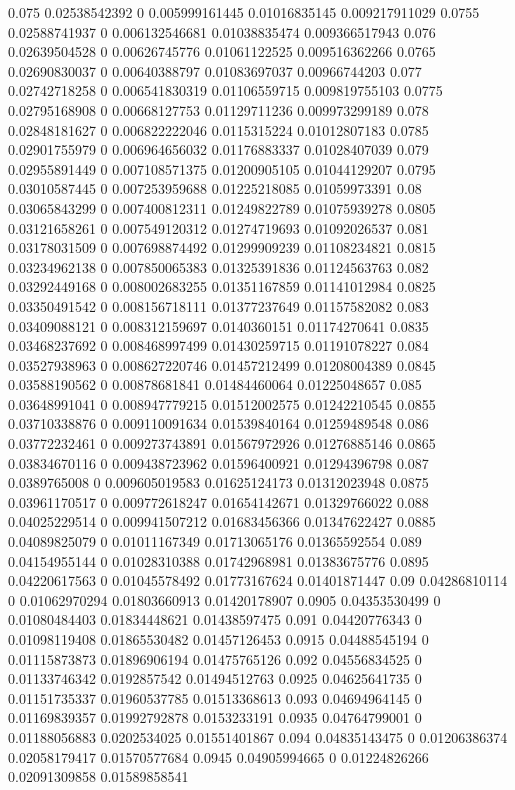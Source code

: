 {0.075 0.02538542392 0 0.005999161445 0.01016835145 0.009217911029
0.0755 0.02588741937 0 0.006132546681 0.01038835474 0.009366517943
0.076 0.02639504528 0 0.00626745776 0.01061122525 0.009516362266
0.0765 0.02690830037 0 0.00640388797 0.01083697037 0.00966744203
0.077 0.02742718258 0 0.006541830319 0.01106559715 0.009819755103
0.0775 0.02795168908 0 0.00668127753 0.01129711236 0.009973299189
0.078 0.02848181627 0 0.006822222046 0.0115315224 0.01012807183
0.0785 0.02901755979 0 0.006964656032 0.01176883337 0.01028407039
0.079 0.02955891449 0 0.007108571375 0.01200905105 0.01044129207
0.0795 0.03010587445 0 0.007253959688 0.01225218085 0.01059973391
0.08 0.03065843299 0 0.007400812311 0.01249822789 0.01075939278
0.0805 0.03121658261 0 0.007549120312 0.01274719693 0.01092026537
0.081 0.03178031509 0 0.007698874492 0.01299909239 0.01108234821
0.0815 0.03234962138 0 0.007850065383 0.01325391836 0.01124563763
0.082 0.03292449168 0 0.008002683255 0.01351167859 0.01141012984
0.0825 0.03350491542 0 0.008156718111 0.01377237649 0.01157582082
0.083 0.03409088121 0 0.008312159697 0.0140360151 0.01174270641
0.0835 0.03468237692 0 0.008468997499 0.01430259715 0.01191078227
0.084 0.03527938963 0 0.008627220746 0.01457212499 0.01208004389
0.0845 0.03588190562 0 0.00878681841 0.01484460064 0.01225048657
0.085 0.03648991041 0 0.008947779215 0.01512002575 0.01242210545
0.0855 0.03710338876 0 0.009110091634 0.01539840164 0.01259489548
0.086 0.03772232461 0 0.009273743891 0.01567972926 0.01276885146
0.0865 0.03834670116 0 0.009438723962 0.01596400921 0.01294396798
0.087 0.0389765008 0 0.009605019583 0.01625124173 0.01312023948
0.0875 0.03961170517 0 0.009772618247 0.01654142671 0.01329766022
0.088 0.04025229514 0 0.009941507212 0.01683456366 0.01347622427
0.0885 0.04089825079 0 0.01011167349 0.01713065176 0.01365592554
0.089 0.04154955144 0 0.01028310388 0.01742968981 0.01383675776
0.0895 0.04220617563 0 0.01045578492 0.01773167624 0.01401871447
0.09 0.04286810114 0 0.01062970294 0.01803660913 0.01420178907
0.0905 0.04353530499 0 0.01080484403 0.01834448621 0.01438597475
0.091 0.04420776343 0 0.01098119408 0.01865530482 0.01457126453
0.0915 0.04488545194 0 0.01115873873 0.01896906194 0.01475765126
0.092 0.04556834525 0 0.01133746342 0.0192857542 0.01494512763
0.0925 0.04625641735 0 0.01151735337 0.01960537785 0.01513368613
0.093 0.04694964145 0 0.01169839357 0.01992792878 0.0153233191
0.0935 0.04764799001 0 0.01188056883 0.0202534025 0.01551401867
0.094 0.04835143475 0 0.01206386374 0.02058179417 0.01570577684
0.0945 0.04905994665 0 0.01224826266 0.02091309858 0.01589858541
}

